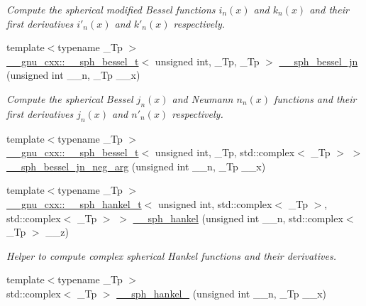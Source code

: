 \begin{DoxyCompactItemize}
\begin{DoxyCompactList}\small\item\em Compute the spherical modified Bessel functions $ i_n(x) $ and $ k_n(x) $ and their first derivatives $ i'_n(x) $ and $ k'_n(x) $ respectively. \end{DoxyCompactList}\item 
{\footnotesize template$<$typename \+\_\+\+Tp $>$ }\\\hyperlink{struct____gnu__cxx_1_1____sph__bessel__t}{\+\_\+\+\_\+gnu\+\_\+cxx\+::\+\_\+\+\_\+sph\+\_\+bessel\+\_\+t}$<$ unsigned int, \+\_\+\+Tp, \+\_\+\+Tp $>$ \hyperlink{namespacestd_1_1____detail_afd4f4f072924a9396676c437135c27f9}{\+\_\+\+\_\+sph\+\_\+bessel\+\_\+jn} (unsigned int \+\_\+\+\_\+n, \+\_\+\+Tp \+\_\+\+\_\+x)
\begin{DoxyCompactList}\small\item\em Compute the spherical Bessel $ j_n(x) $ and Neumann $ n_n(x) $ functions and their first derivatives $ j_n(x) $ and $ n'_n(x) $ respectively. \end{DoxyCompactList}\item 
{\footnotesize template$<$typename \+\_\+\+Tp $>$ }\\\hyperlink{struct____gnu__cxx_1_1____sph__bessel__t}{\+\_\+\+\_\+gnu\+\_\+cxx\+::\+\_\+\+\_\+sph\+\_\+bessel\+\_\+t}$<$ unsigned int, \+\_\+\+Tp, std\+::complex$<$ \+\_\+\+Tp $>$ $>$ \hyperlink{namespacestd_1_1____detail_a8c2a1782e4030a517568aaebecb09f9d}{\+\_\+\+\_\+sph\+\_\+bessel\+\_\+jn\+\_\+neg\+\_\+arg} (unsigned int \+\_\+\+\_\+n, \+\_\+\+Tp \+\_\+\+\_\+x)
\item 
{\footnotesize template$<$typename \+\_\+\+Tp $>$ }\\\hyperlink{struct____gnu__cxx_1_1____sph__hankel__t}{\+\_\+\+\_\+gnu\+\_\+cxx\+::\+\_\+\+\_\+sph\+\_\+hankel\+\_\+t}$<$ unsigned int, std\+::complex$<$ \+\_\+\+Tp $>$, std\+::complex$<$ \+\_\+\+Tp $>$ $>$ \hyperlink{namespacestd_1_1____detail_a1babbc6df4e260ad0e828044c9f33ca1}{\+\_\+\+\_\+sph\+\_\+hankel} (unsigned int \+\_\+\+\_\+n, std\+::complex$<$ \+\_\+\+Tp $>$ \+\_\+\+\_\+z)
\begin{DoxyCompactList}\small\item\em Helper to compute complex spherical Hankel functions and their derivatives. \end{DoxyCompactList}\item 
{\footnotesize template$<$typename \+\_\+\+Tp $>$ }\\std\+::complex$<$ \+\_\+\+Tp $>$ \hyperlink{namespacestd_1_1____detail_adcc174fe4cb03d428f19abcae8012b50}{\+\_\+\+\_\+sph\+\_\+hankel\+\_} (unsigned int \+\_\+\+\_\+n, \+\_\+\+Tp \+\_\+\+\_\+x)

\end{DoxyCompactItemize}
